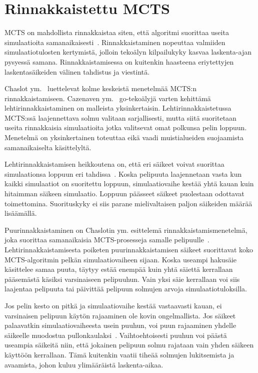 \documentclass[12pt,finnish]{tktltiki2}
\theoremstyle{definition}
\theoremstyle{remark}
\begin{document}
\section{Rinnakkaistettu MCTS}

MCTS on mahdollista rinnakkaistaa siten, että algoritmi suorittaa useita simulaatioita samanaikaisesti~\cite{browne, cazenave}. Rinnakkaistaminen nopeuttaa valmiiden simulaatiotulosten kertymistä, jolloin tekoälyn kilpailukyky kasvaa laskenta-ajan pysyessä samana. Rinnakkaistamisessa on kuitenkin haasteena eriytettyjen laskentasäikeiden välinen tahdistus ja viestintä.

Chaslot ym.~\cite{chaslot} luettelevat kolme keskeistä menetelmää MCTS:n rinnakkaistamiseen. Cazenaven ym.~\cite{cazenave} go-tekoälyjä varten kehittämä lehtirinnakkaistaminen on malleista yksinkertaisin. Lehtirinnakkaistetussa MCTS:ssä laajennettava solmu valitaan sarjallisesti, mutta siitä suoritetaan useita rinnakkaisia simulaatioita jotka valitsevat omat polkunsa pelin loppuun. Menetelmä on yksinkertainen toteuttaa eikä vaadi muistialueiden suojaamista samanaikaiselta käsittelyltä.

Lehtirinnakkaistamisen heikkoutena on, että eri säikeet voivat suorittaa simulaationsa loppuun eri tahdissa~\cite{chaslot}. Koska pelipuuta laajennetaan vasta kun kaikki simulaatiot on suoritettu loppuun, simulaatiovaihe kestää yhtä kauan kuin hitaimman säikeen simulaatio. Loppuun päässeet säikeet puolestaan odottavat toimettomina. Suorituskyky ei siis parane mielivaltaisen paljon säikeiden määrää lisäämällä.

Puurinnakkaistaminen on Chaslotin ym. esittelemä rinnakkaistamismenetelmä, joka suorittaa samanaikaisia MCTS-prosesseja samalle pelipuulle~\cite{chaslot}. Lehtirinnakkaistamisesta poiketen puurinnakkaistamisen säikeet suorittavat koko MCTS-algoritmin pelkän simulaatiovaiheen sijaan. Koska useampi hakusäie käsittelee samaa puuta, täytyy estää enempää kuin yhtä säiettä kerrallaan pääsemästä käsiksi varsinaiseen pelipuuhun. Vain yksi säie kerrallaan voi siis laajentaa pelipuuta tai päivittää pelipuun solmujen arvoja simulaatiotuloksilla.

Jos pelin kesto on pitkä ja simulaatiovaihe kestää vastaavasti kauan, ei varsinaisen pelipuun käytön rajaaminen ole kovin ongelmallista. Jos säikeet palaavatkin simulaatiovaiheesta usein puuhun, voi puun rajaaminen yhdelle säikeelle muodostua pullonkaulaksi~\cite{chaslot}. Vaihtoehtoisesti puuhun voi päästä useampia säikeitä niin, että jokainen pelipuun solmu rajataan vain yhden säikeen käyttöön kerrallaan. Tämä kuitenkin vaatii tiheää solmujen lukitsemista ja avaamista, johon kuluu ylimääräistä laskenta-aikaa.
\end{document}
